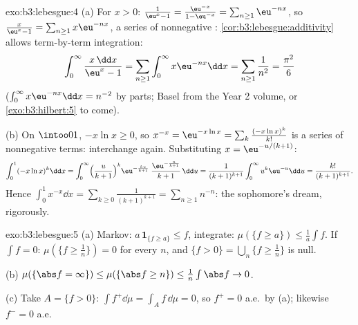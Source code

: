 \begin{solution}{exo:b3:lebesgue:4}
(a) For $x > 0$: $\frac1{\eu^x - 1} = \frac{\eu^{-x}}{1 -
\eu^{-x}} = \sum_{n\geq1}\eu^{-nx}$, so $\frac{x}{\eu^x - 1} =
\sum_{n\geq1}x\eu^{-nx}$, a series of nonnegative : \cref{cor:b3:lebesgue:additivity} allows term-by-term
integration:
\[
\int_0^\infty\frac{x\,\dd x}{\eu^x - 1}
= \sum_{n\geq1}\int_0^\infty x\eu^{-nx}\dd x
= \sum_{n\geq1}\frac1{n^2} = \frac{\pi^2}6
\]
($\int_0^\infty x\eu^{-nx}\dd x = n^{-2}$ by parts; Basel from
the Year 2 volume, or \cref{exo:b3:hilbert:5} to come).

(b) On $\intoo01$, $-x\ln x \geq 0$, so $x^{-x} =
\eu^{-x\ln x} = \sum_k\frac{(-x\ln x)^k}{k!}$ is a series of
nonnegative terms: interchange again. Substituting $x =
\eu^{-u/(k+1)}$:
\[
\int_0^1(-x\ln x)^k\dd x
= \int_0^\infty\Bigl(\frac{u}{k+1}\Bigr)^{k}
\eu^{-\frac{ku}{k+1}}\;\frac{\eu^{-\frac u{k+1}}}{k+1}\,\dd u
= \frac{1}{(k+1)^{k+1}}\int_0^\infty u^k\eu^{-u}\dd u
= \frac{k!}{(k+1)^{k+1}} .
\]
Hence $\int_0^1x^{-x}\dd x = \sum_{k\geq0}\frac{1}{(k+1)^{k+1}}
= \sum_{n\geq1}n^{-n}$: the sophomore's dream, rigorously.
\end{solution}

\begin{solution}{exo:b3:lebesgue:5}
(a) Markov: $a\,\mathbf 1_{\{f \geq a\}} \leq f$, integrate:
$\mu(\{f \geq a\}) \leq \frac1a\int f$. If $\int f = 0$:
$\mu(\{f \geq \frac1n\}) = 0$ for every $n$, and $\{f > 0\} =
\bigcup_n\{f \geq \frac1n\}$ is null.

(b) $\mu(\{\abs f = \infty\}) \leq \mu(\{\abs f \geq n\}) \leq
\frac1n\int\abs f \to 0$.

(c) Take $A = \{f > 0\}$: $\int f^+\dd\mu = \int_Af\,\dd\mu =
0$, so $f^+ = 0$ a.e.\ by (a); likewise $f^- = 0$ a.e.
\end{solution}


